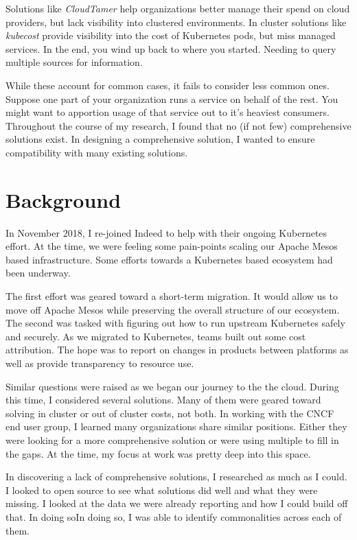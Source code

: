 \documentclass[10pt, a4paper, twocolumn]{article}
\begin{document}
  Solutions like \textit{CloudTamer} help organizations better manage their spend on cloud providers, but lack visibility into clustered environments.
  In cluster solutions like \textit{kubecost} provide visibility into the cost of Kubernetes pods, but miss managed services.
  In the end, you wind up back to where you started.
  Needing to query multiple sources for information.

  While these account for common cases, it fails to consider less common ones.
  Suppose one part of your organization runs a service on behalf of the rest.
  You might want to apportion usage of that service out to it's heaviest consumers.
  Throughout the course of my research, I found that no (if not few) comprehensive solutions exist.
  In designing a comprehensive solution, I wanted to ensure compatibility with many existing solutions.


\section*{Background}
  In November 2018, I re-joined Indeed to help with their ongoing Kubernetes effort.
  At the time, we were feeling some pain-points scaling our Apache Mesos based infrastructure.
  Some efforts towards a Kubernetes based ecosystem had been underway.

  The first effort was geared toward a short-term migration.
  It would allow us to move off Apache Mesos while preserving the overall structure of our ecosystem.
  The second was tasked with figuring out how to run upstream Kubernetes safely and securely.
  As we migrated to Kubernetes, teams built out some cost attribution.
  The hope was to report on changes in products between platforms as well as provide transparency to resource use.

  Similar questions were raised as we began our journey to the the cloud.
  During this time, I considered several solutions.
  Many of them were geared toward solving in cluster or out of cluster costs, not both.
  In working with the CNCF end user group, I learned many organizations share similar positions.
  Either they were looking for a more comprehensive solution or were using multiple to fill in the gaps.
  At the time, my focus at work was pretty deep into this space.

  In discovering a lack of comprehensive solutions, I researched as much as I could.
  I looked to open source to see what solutions did well and what they were missing.
  I looked at the data we were already reporting and how I could build off that.
  In doing soIn doing so, I was able to identify commonalities across each of them.
\end{document}
